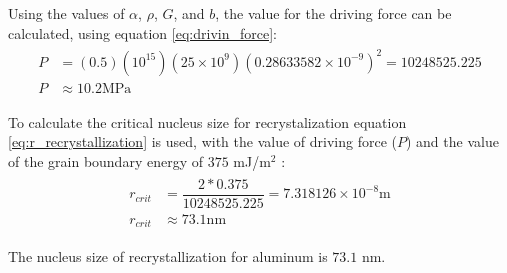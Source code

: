 Using the values of $\alpha$, $\rho$, $G$, and $b$, the value for the driving force can be calculated, using equation \ref{eq:drivin_force}:
\begin{align}
    \label{eq:drivin_force_num}
    \begin{split}
        P&=\left(0.5\right)\left(10^{15}\right)\left(25\times10^9\right)\left(0.28633582\times10^{-9}\right)^2=10248525.225 \\
        P&\approx 10.2 \text{MPa}
    \end{split}
\end{align}

To calculate the critical nucleus size for recrystalization equation \ref{eq:r_recrystallization} is used, with the value of driving force ($P$) and the value of the grain boundary energy of $375$ mJ/m$^2$ \citep[p.~125]{rollett2017recrystallization}:
\begin{align}
    \label{eq:recrystallization_num}
    \begin{split}
        r_{crit}&=\dfrac{2*0.375}{10248525.225} = 7.318126\times10^{-8} \text{m} \\
        r_{crit}&\approx 73.1 \text{nm}
    \end{split}
\end{align}

\begin{mdframed}
    The nucleus size of recrystallization for aluminum is $73.1$ nm.
\end{mdframed}
